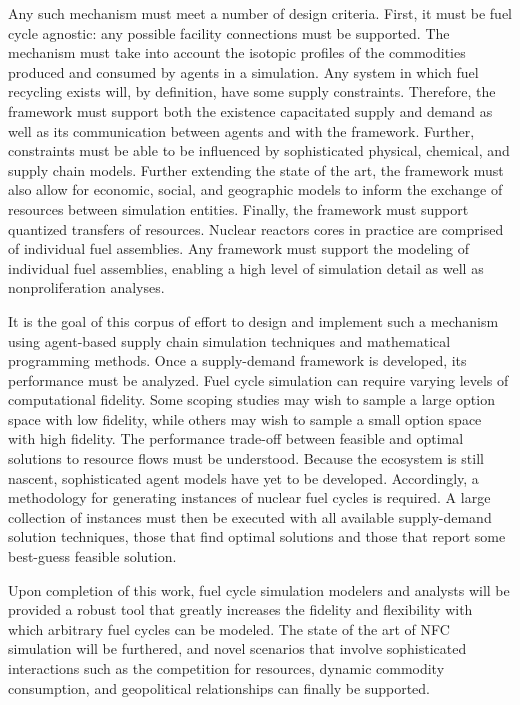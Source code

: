 Any such mechanism must meet a number of design criteria. First, it must be fuel
cycle agnostic: any possible facility connections must be supported. The
mechanism must take into account the isotopic profiles of the commodities
produced and consumed by agents in a simulation. Any system in which fuel
recycling exists will, by definition, have some supply constraints. Therefore,
the framework must support both the existence capacitated supply and demand as
well as its communication between agents and with the framework. Further,
constraints must be able to be influenced by sophisticated physical, chemical,
and supply chain models. Further extending the state of the art, the framework
must also allow for economic, social, and geographic models to inform the
exchange of resources between simulation entities. Finally, the framework must
support quantized transfers of resources. Nuclear reactors cores in practice are
comprised of individual fuel assemblies. Any framework must support the modeling
of individual fuel assemblies, enabling a high level of simulation detail as
well as nonproliferation analyses.

It is the goal of this corpus of effort to design and implement such a mechanism
using agent-based supply chain simulation techniques and mathematical
programming methods.  Once a supply-demand framework is developed, its
performance must be analyzed. Fuel cycle simulation can require varying levels
of computational fidelity. Some scoping studies may wish to sample a large
option space with low fidelity, while others may wish to sample a small option
space with high fidelity. The performance trade-off between feasible and optimal
solutions to resource flows must be understood. Because the \Cyclus ecosystem is
still nascent, sophisticated agent models have yet to be developed. Accordingly,
a methodology for generating instances of nuclear fuel cycles is required. A
large collection of instances must then be executed with all available
supply-demand solution techniques, those that find optimal solutions and those
that report some best-guess feasible solution.

Upon completion of this work, fuel cycle simulation modelers and analysts will
be provided a robust tool that greatly increases the fidelity and flexibility
with which arbitrary fuel cycles can be modeled. The state of the art of NFC
simulation will be furthered, and novel scenarios that involve sophisticated
interactions such as the competition for resources, dynamic commodity
consumption, and geopolitical relationships can finally be supported.
